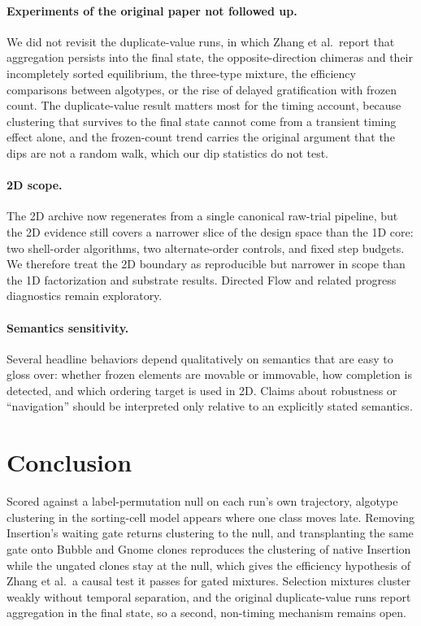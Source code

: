 \documentclass[11pt]{article}
\begin{document}
\paragraph{Experiments of the original paper not followed up.}
We did not revisit the duplicate-value runs, in which Zhang et al.\ report that aggregation
persists into the final state, the opposite-direction chimeras and their incompletely sorted
equilibrium, the three-type mixture, the efficiency comparisons between algotypes, or the rise of
delayed gratification with frozen count. The duplicate-value result matters most for the timing
account, because clustering that survives to the final state cannot come from a transient timing
effect alone, and the frozen-count trend carries the original argument that the dips are not a
random walk, which our dip statistics do not test.

\paragraph{2D scope.}
The 2D archive now regenerates from a single canonical raw-trial pipeline, but the 2D evidence
still covers a narrower slice of the design space than the 1D core: two shell-order algorithms,
two alternate-order controls, and fixed step budgets. We therefore treat the 2D boundary as
reproducible but narrower in scope than the 1D factorization and substrate results. Directed Flow
and related progress diagnostics remain exploratory.

\paragraph{Semantics sensitivity.}
Several headline behaviors depend qualitatively on semantics that are easy to gloss over: whether
frozen elements are movable or immovable, how completion is detected, and which ordering target is
used in 2D. Claims about robustness or ``navigation'' should be interpreted only relative to an
explicitly stated semantics.

\section{Conclusion}
Scored against a label-permutation null on each run's own trajectory, algotype clustering in the
sorting-cell model appears where one class moves late. Removing Insertion's waiting gate returns
clustering to the null, and transplanting the same gate onto Bubble and Gnome clones reproduces the
clustering of native Insertion while the ungated clones stay at the null, which gives the
efficiency hypothesis of Zhang et al.\ a causal test it passes for gated mixtures. Selection
mixtures cluster weakly without temporal separation, and the original duplicate-value runs report
aggregation in the final state, so a second, non-timing mechanism remains open.
\end{document}
